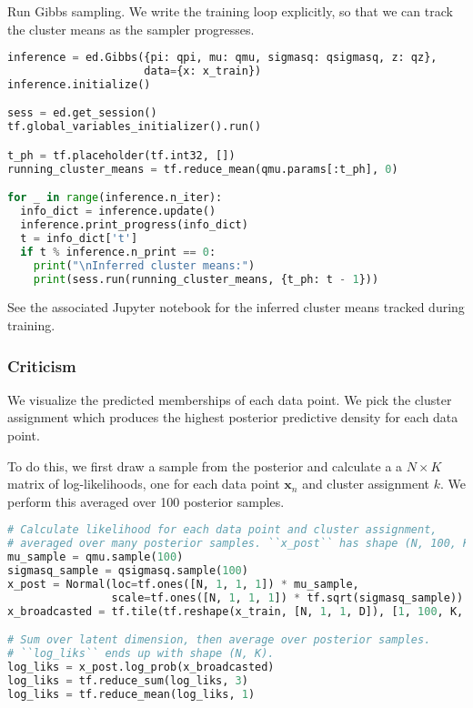 Run Gibbs sampling. We write the training loop explicitly, so that we can track
the cluster means as the sampler progresses.
\begin{lstlisting}[language=Python]
inference = ed.Gibbs({pi: qpi, mu: qmu, sigmasq: qsigmasq, z: qz},
                     data={x: x_train})
inference.initialize()

sess = ed.get_session()
tf.global_variables_initializer().run()

t_ph = tf.placeholder(tf.int32, [])
running_cluster_means = tf.reduce_mean(qmu.params[:t_ph], 0)

for _ in range(inference.n_iter):
  info_dict = inference.update()
  inference.print_progress(info_dict)
  t = info_dict['t']
  if t % inference.n_print == 0:
    print("\nInferred cluster means:")
    print(sess.run(running_cluster_means, {t_ph: t - 1}))
\end{lstlisting}

See the associated Jupyter notebook for the inferred cluster means
tracked during training.

\subsubsection{Criticism}

We visualize the predicted memberships of each data point. We pick
the cluster assignment which produces the highest posterior predictive
density for each data point.

To do this, we first draw a sample from the posterior and calculate a
a $N\times K$ matrix of log-likelihoods, one for each data point
$\mathbf{x}_n$ and cluster assignment $k$.
We perform this averaged over 100 posterior samples.

\begin{lstlisting}[language=Python]
# Calculate likelihood for each data point and cluster assignment,
# averaged over many posterior samples. ``x_post`` has shape (N, 100, K, D).
mu_sample = qmu.sample(100)
sigmasq_sample = qsigmasq.sample(100)
x_post = Normal(loc=tf.ones([N, 1, 1, 1]) * mu_sample,
                scale=tf.ones([N, 1, 1, 1]) * tf.sqrt(sigmasq_sample))
x_broadcasted = tf.tile(tf.reshape(x_train, [N, 1, 1, D]), [1, 100, K, 1])

# Sum over latent dimension, then average over posterior samples.
# ``log_liks`` ends up with shape (N, K).
log_liks = x_post.log_prob(x_broadcasted)
log_liks = tf.reduce_sum(log_liks, 3)
log_liks = tf.reduce_mean(log_liks, 1)
\end{lstlisting}

